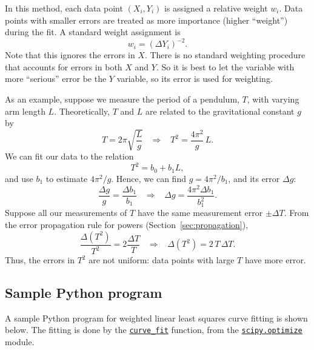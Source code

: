 \documentclass[11pt,a4paper]{article}
\begin{document}
In this method, each data point $(X_i,Y_i)$ is assigned a relative
weight $w_i$.  Data points with smaller errors are treated as more
importance (higher ``weight'') during the fit.  A standard weight
assignment is
\begin{equation*}
  w_i = (\Delta Y_i)^{-2}.
  \label{weighting}
\end{equation*}
Note that this ignores the errors in $X$.  There is no standard
weighting procedure that accounts for errors in both $X$ and $Y$.  So
it is best to let the variable with more ``serious'' error be the $Y$
variable, so its error is used for weighting.

As an example, suppose we measure the period of a pendulum, $T$, with
varying arm length $L$.  Theoretically, $T$ and $L$ are related to the
gravitational constant $g$ by
\begin{equation*}
  T = 2\pi \sqrt{\frac{L}{g}} \;\;\; \Rightarrow \;\;\; T^2 = \frac{4\pi^2}{g} \, L.
\end{equation*}
We can fit our data to the relation
\begin{equation*}
  T^2 = b_0 + b_1 L,
\end{equation*}
and use $b_1$ to estimate $4\pi^2/g$.  Hence, we can find $g =
4\pi^2/b_1$, and its error $\Delta g$:
\begin{equation*}
  \frac{\Delta g}{g} = \frac{\Delta b_1}{b_1} \;\;\;\Rightarrow\;\;\;
  \Delta g = \frac{4\pi^2\Delta b_1}{b_1^2}.
\end{equation*}
Suppose all our measurements of $T$ have the same measurement error
$\pm \Delta T$.  From the error propagation rule for powers
(Section~\ref{sec:propagation}),
\begin{equation*}
  \frac{\Delta (T^2)}{T^2} = 2 \frac{\Delta T}{T} \;\;\;\Rightarrow
  \;\;\; \Delta (T^2) = 2\,T\,\Delta T.
\end{equation*}
Thus, the errors in $T^2$ are not uniform: data points with large $T$
have more error.

\subsection{Sample Python program}

A sample Python program for weighted linear least squares curve
fitting is shown below.  The fitting is done by the
\href{https://docs.scipy.org/doc/scipy/reference/generated/scipy.optimize.curve_fit.html}{\texttt{curve\_fit}}
function, from the
\href{https://docs.scipy.org/doc/scipy/reference/optimize.html}{\texttt{scipy.optimize}}
module.
\end{document}
